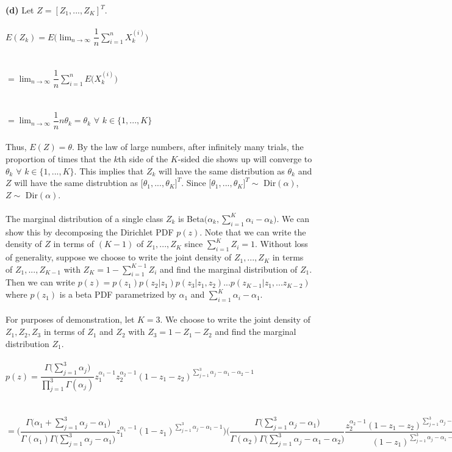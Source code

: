 \documentclass[submit]{harvardml}
\begin{document}
\textbf{(d)} Let $Z=[Z_1,...,Z_K]^T$.\\\\
$E(Z_k)=E\Bigg(\lim_{n \rightarrow \infty} \dfrac{1}{n}\displaystyle\sum_{i=1}^nX_k^{(i)}\Bigg)$\\\\\\
$=\lim_{n \rightarrow \infty} \dfrac{1}{n}\displaystyle\sum_{i=1}^nE\Big(X_k^{(i)}\Big)$\\\\\\
$=\lim_{n \rightarrow \infty} \dfrac{1}{n}n\theta_k=\theta_k$ $\forall$ $k\in\{1,...,K\}$\\\\
Thus, $E(Z)=\theta$. By the law of large numbers, after infinitely many trials, the proportion of times that the $k$th side of the $K$-sided die shows up will converge to $\theta_k$ $\forall$ $k\in\{1,...,K\}$. This implies that $Z_k$ will have the same distribution as $\theta_k$ and $Z$ will have the same distrubtion as $\big[\theta_1,...,\theta_K\big]^T$. Since $\big[\theta_1,...,\theta_K\big]^T\sim$ Dir$(\alpha)$, $Z\sim$ Dir$(\alpha)$.\\\\
The marginal distribution of a single class $Z_k$ is Beta$\Bigg(\alpha_k,\displaystyle\sum_{i=1}^{K}\alpha_i-\alpha_k\Bigg)$. We can show this by decomposing the Dirichlet PDF $p(z)$. Note that we can write the density of $Z$ in terms of $(K-1)$ of $Z_1,...,Z_K$ since $\sum_{i=1}^{K}Z_i=1$. Without loss of generality, suppose we choose to write the joint density of $Z_1,...,Z_K$ in terms of $Z_1,...,Z_{K-1}$ with $Z_K=1-\sum_{i=1}^{K-1}Z_i$ and find the marginal distribution of $Z_1$. Then we can write $p(z)=p(z_1)p(z_2|z_1)p(z_3|z_1,z_2)...p(z_{K-1}|z_1,...z_{K-2})$ where $p(z_1)$ is a beta PDF parametrized by $\alpha_1$ and $\sum_{i=1}^{K}\alpha_i-\alpha_1$.\\\\
For purposes of demonstration, let $K=3$. We choose to write the joint density of $Z_1,Z_2,Z_3$ in terms of $Z_1$ and $Z_2$ with $Z_3=1-Z_1-Z_2$ and find the marginal distribution $Z_1$.\\\\
$p(z)=\dfrac{\Gamma\Big(\sum_{j=1}^{3}\alpha_j\Big)}{\prod_{j=1}^{3}\Gamma(\alpha_j)}z_1^{\alpha_1-1}z_2^{\alpha_2-1}(1-z_1-z_2)^{\sum_{j=1}^{3}\alpha_j-\alpha_1-\alpha_2-1}$\\\\\\
$=\Bigg(\dfrac{\Gamma\big(\alpha_1+\sum_{j=1}^{3}\alpha_j-\alpha_1\big)}{\Gamma(\alpha_1)\Gamma\big(\sum_{j=1}^{3}\alpha_j-\alpha_1\big)}z_1^{\alpha_1-1}(1-z_1)^{\sum_{j=1}^{3}\alpha_j-\alpha_1-1}\Bigg)\Bigg(\dfrac{\Gamma\big(\sum_{j=1}^{3}\alpha_j-\alpha_1\big)}{\Gamma(\alpha_2)\Gamma\big(\sum_{j=1}^{3}\alpha_j-\alpha_1-\alpha_2\big)}\dfrac{z_2^{\alpha_2-1}(1-z_1-z_2)^{\sum_{j=1}^{3}\alpha_j-\alpha_1-\alpha_2-1}}{(1-z_1)^{\sum_{j=1}^{3}\alpha_j-\alpha_1-1}}\Bigg)$\\\\\\
\end{document}
